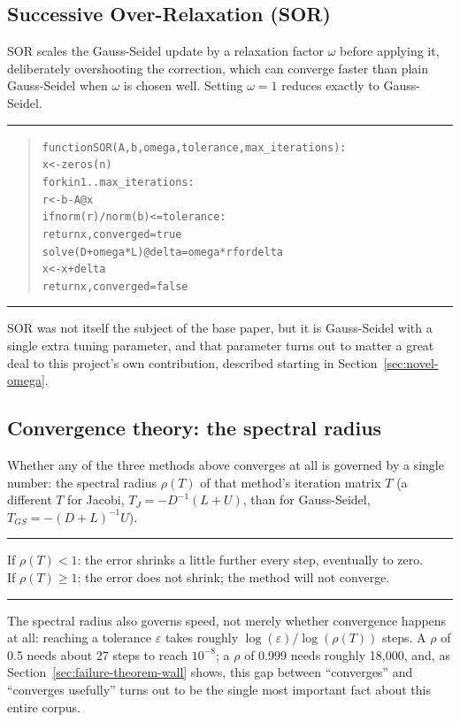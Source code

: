 \documentclass[11pt,a4paper]{article}
\newenvironment{formulabox}
  {\begin{center}\color{SBteal}\rule{0.92\linewidth}{0.8pt}\par\vspace{5pt}\color{SBnavy}}
  {\par\vspace{3pt}\color{SBteal}\rule{0.92\linewidth}{0.8pt}\end{center}}
\newenvironment{pseudobox}
  {\begin{center}\color{SBgold}\rule{0.92\linewidth}{0.8pt}\end{center}\vspace{-2pt}
   \begin{quote}\small\color{SBnavy}
   \begin{alltt}\ttfamily}
  {\end{alltt}\end{quote}\vspace{-6pt}\begin{center}\color{SBgold}\rule{0.92\linewidth}{0.8pt}\end{center}}
\begin{document}
\subsection{Successive Over-Relaxation (SOR)}
\label{sec:methods-sor}

SOR scales the Gauss-Seidel update by a relaxation factor $\omega$ before applying it,
deliberately overshooting the correction, which can converge faster than plain
Gauss-Seidel when $\omega$ is chosen well. Setting $\omega=1$ reduces exactly to
Gauss-Seidel.

\begin{pseudobox}
function SOR(A, b, omega, tolerance, max_iterations):
    x <- zeros(n)
    for k in 1 .. max_iterations:
        r <- b - A @ x
        if norm(r) / norm(b) <= tolerance:
            return x, converged = true
        solve (D + omega * L) @ delta = omega * r   for delta
        x <- x + delta
    return x, converged = false
\end{pseudobox}

SOR was not itself the subject of the base paper, but it is Gauss-Seidel with a single
extra tuning parameter, and that parameter turns out to matter a great deal to this
project's own contribution, described starting in Section~\ref{sec:novel-omega}.

\subsection{Convergence theory: the spectral radius}
\label{sec:methods-spectral}

Whether any of the three methods above converges at all is governed by a single number:
the spectral radius $\rho(T)$ of that method's iteration matrix $T$ (a different $T$ for
Jacobi, $T_J = -D^{-1}(L+U)$, than for Gauss-Seidel, $T_{GS}=-(D+L)^{-1}U$).

\begin{formulabox}
If $\rho(T) < 1$: the error shrinks a little further every step, eventually to zero.\\
If $\rho(T) \geq 1$: the error does not shrink; the method will not converge.
\end{formulabox}

The spectral radius also governs speed, not merely whether convergence happens at all:
reaching a tolerance $\varepsilon$ takes roughly $\log(\varepsilon)/\log(\rho(T))$ steps. A
$\rho$ of 0.5 needs about 27 steps to reach $10^{-8}$; a $\rho$ of 0.999 needs roughly
18{,}000, and, as Section~\ref{sec:failure-theorem-wall} shows, this gap between
``converges'' and ``converges usefully'' turns out to be the single most important fact
about this entire corpus.
\end{document}
